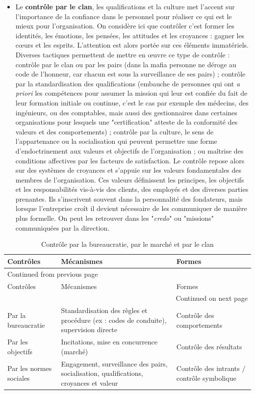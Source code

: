 \documentclass{kaobook}
\begin{document}
\begin{itemize}
\item Le \textbf{contrôle par le clan}, les qualifications et la culture met l'accent sur l'importance de la confiance dans le personnel pour réaliser ce qui est le mieux pour l'organisation. On considère ici que contrôler c'est former les identités, les émotions, les pensées, les attitudes et les croyances : gagner les cœurs et les esprits. L'attention est alors portée sur ces éléments immatériels. Diverses tactiques permettent de mettre en œuvre ce type de contrôle : contrôle par le clan ou par les pairs (dans la mafia personne ne déroge au code de l'honneur, car chacun est sous la surveillance de ses pairs) ; contrôle par la standardisation des qualifications (embauche de personnes qui ont \emph{a priori} les compétences pour assumer la mission qui leur est confiée du fait de leur formation initiale ou continue, c'est le cas par exemple des médecins, des ingénieurs, ou des comptables, mais aussi des gestionnaires dans certaines organisations pour lesquels une "certification" atteste de la conformité des valeurs et des comportements) ; contrôle par la culture, le sens de l'appartenance ou la socialisation qui peuvent permettre une forme d'endoctrinement aux valeurs et objectifs de l'organisation ; ou maîtrise des conditions affectives par les facteurs de satisfaction. Le contrôle repose alors sur des systèmes de croyances et s'appuie sur les valeurs fondamentales des membres de l'organisation. Ces valeurs définissent les principes, les objectifs et les responsabilités vis-à-vis des clients, des employés et des diverses parties prenantes. Ils s'inscrivent souvent dans la personnalité des fondateurs, mais lorsque l'entreprise croît il devient nécessaire de les communiquer de manière plus formelle. On peut les retrouver dans les "\emph{credo}" ou "missions" communiquées par la direction.\\
\end{itemize}
\begin{longtable}{p{4cm} p{7cm} p{5cm}}
\caption{Contrôle par la bureaucratie, par le marché et par le clan}
\\
Contrôles & Mécanismes & Formes\\
\hline
\endfirsthead
\multicolumn{3}{l}{Continued from previous page} \\
\hline

Contrôles & Mécanismes & Formes \\

\hline
\endhead
\hline\multicolumn{3}{r}{Continued on next page} \\
\endfoot
\endlastfoot
\hline
Par la bureaucratie & Standardisation des règles et procédure (ex : codes de conduite), supervision directe & Contrôle des comportements\\
Par les objectifs & Incitations, mise en concurrence (marché) & Contrôle des résultats\\
Par les normes sociales & Engagement, surveillance des pairs, socialisation, qualifications, croyances et valeur & Contrôle des intrants / contrôle symbolique\\
\end{longtable}
\end{document}
